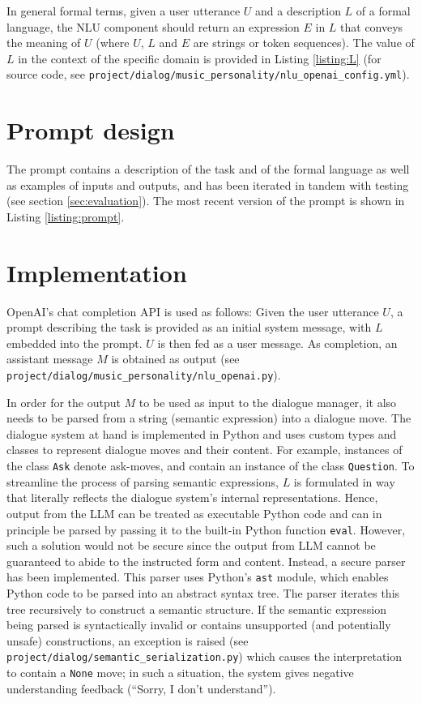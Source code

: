 \documentclass[11pt]{article}
\begin{document}
In general formal terms, given a user utterance $U$ and a description $L$ of a formal language, the NLU component should return an expression $E$ in $L$ that conveys the meaning of $U$ (where $U$, $L$ and $E$ are strings or token sequences). The value of $L$ in the context of the specific domain is provided in Listing \ref{listing:L} (for source code, see \texttt{project/dialog/music\_personality/nlu\_openai\_config.yml}).



\section{Prompt design}
The prompt contains a description of the task and of the formal language as well as examples of inputs and outputs, and has been iterated in tandem with testing (see section \ref{sec:evaluation}). The most recent version of the prompt is shown in Listing \ref{listing:prompt}.



\section{Implementation}
OpenAI's chat completion API is used as follows: Given the user utterance $U$, a prompt describing the task is provided as an initial system message, with $L$ embedded into the prompt. $U$ is then fed as a user message. As completion, an assistant message $M$ is obtained as output (see \texttt{project/dialog/music\_personality/nlu\_openai.py}). 

In order for the output $M$ to be used as input to the dialogue manager, it also needs to be parsed from a string (semantic expression) into a dialogue move. The dialogue system at hand is implemented in Python and uses custom types and classes to represent dialogue moves and their content. For example, instances of the class \texttt{Ask} denote ask-moves, and contain an instance of the class \texttt{Question}. To streamline the process of parsing semantic expressions, $L$ is formulated in way that literally reflects the dialogue system's internal representations. Hence, output from the LLM can be treated as executable Python code and can in principle be parsed by passing it to the built-in Python function \texttt{eval}. However, such a solution would not be secure since the output from LLM cannot be guaranteed to abide to the instructed form and content. Instead, a secure parser has been implemented. This parser uses Python's \texttt{ast} module, which enables Python code to be parsed into an abstract syntax tree. The parser iterates this tree recursively to construct a semantic structure. If the semantic expression being parsed is syntactically invalid or contains unsupported (and potentially unsafe) constructions, an exception is raised (see \texttt{project/dialog/semantic\_serialization.py}) which causes the interpretation to contain a \texttt{None} move; in such a situation, the system gives negative understanding feedback (``Sorry, I don't understand'').
\end{document}
